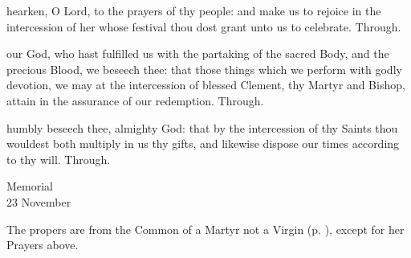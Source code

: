  hearken, O Lord, to the prayers of thy people: and make us to rejoice in the intercession of her whose festival thou dost grant unto us to celebrate. Through.


\postcommunion
{} our God, who hast fulfilled us with the partaking of the sacred Body, and the precious Blood, we beseech thee: that those things which we perform with godly devotion, we may at the intercession of blessed Clement, thy Martyr and Bishop, attain in the assurance of our redemption. Through.

 humbly beseech thee, almighty God: that by the intercession of thy Saints thou wouldest both multiply in us thy gifts, and likewise dispose our times according to thy will. Through.

\begin{inhead}
    {Memorial\\
23 November}
\end{inhead}

\begin{rubric}
	The propers are from the Common of a Martyr not a Virgin (p. \pageref{CommonMartyrNotVirgin}), except for her Prayers above.
\end{rubric}